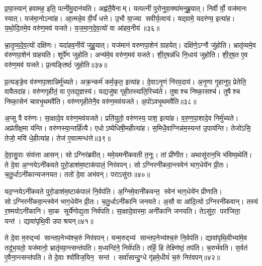 प्र॒घा॒स्यान्॑ हवामह॒ इति॒ पत्नी॑मु॒दान॑यति।
अह्व॑तै॒वैनाम्।
यत्पत्नी॑ पुरोनुवा॒क्या॑मनुब्रू॒यात्।
निर्वीर्यो॒ यज॑मानः स्यात्।
यज॑मा॒नोऽन्वा॑ह।
आ॒त्मन्ने॒व वी॒र्यं॑ धत्ते।
उ॒भौ या॒ज्या सवीर्य॒त्वाय॑।
यद्ग्रामे॒ यदर॑ण्य॒ इत्या॑ह।
य॒थो॒दि॒तमे॒व वरु॑ण॒मव॑ यजते।
य॒ज॒मा॒न॒दे॒व॒त्यो॑ वा आ॑हव॒नीय॑॥३६॥

भ्रा॒तृ॒व्य॒दे॒व॒त्यो॑ दक्षि॑णः।
यदा॑हव॒नीये॑ जुहु॒यात्।
यज॑मानं वरुणपा॒शेन॑ ग्राहयेत्।
दक्षि॑णे॒ऽग्नौ जु॑होति।
भ्रातृ॑व्यमे॒व व॑रुणपा॒शेन॑ ग्राहयति।
शूर्पे॑ण जुहोति।
अन्य॑मे॒व वरु॑ण॒मव॑ यजते।
शी॒र्॒षन्न॑धि नि॒धाय॑ जुहोति।
शी॒र्॒\mbox{}ष॒त ए॒व वरु॑ण॒मव॑ यजते।
प्र॒त्यङ्तिष्ठं॑ जुहोति॥३७॥

प्र॒त्यङ्ङे॒व व॑रुणपा॒शान्निर्मु॑च्यते।
अक्र॒न्कर्म॑ कर्म॒कृत॒ इत्या॑ह।
दे॒वाऽनृ॒णं नि॑रव॒दाय॑।
अ॒नृ॒णा गृ॒हानुप॒ प्रेतेति॒ वावैतदा॑ह।
वरु॑णगृहीतं॒ वा ए॒तद्य॒ज्ञस्य॑।
यद्यजु॑षा गृही॒तस्या॑ति॒रिच्य॑ते।
तुषाश्च निष्का॒सश्च॑।
तुषैश्च निष्का॒सेन॑ चावभृ॒थमवै॑ति।
वरु॑णगृहीतेनै॒व वरु॑ण॒मव॑यजते।
अ॒पो॑ऽवभृ॒थमवै॑ति॥३८॥

अ॒प्सु वै वरु॑णः।
सा॒क्षादे॒व वरु॑ण॒मव॑यजते।
प्रति॑युतो॒ वरु॑णस्य॒ पाश॒ इत्या॑ह।
व॒रु॒ण॒पा॒शादे॒व निर्मु॑च्यते।
अप्र॑तीक्ष॒मा य॑न्ति।
वरु॑णस्या॒न्तर्\mbox{}हि॑त्यै।
एधोऽष्येधिषी॒मही\-त्या॑ह।
स॒मिधै॒वाग्निन्न॑म॒स्यन्त॑ उ॒पाय॑न्ति।
तेजो॑ऽसि॒ तेजो॒ मयि॑ धे॒हीत्या॑ह।
तेज॑ ए॒वात्मन्ध॑त्ते॥३९॥

दे॒वा॒सु॒राः संय॑त्ता आसन्।
सोऽग्निर॑ब्रवीत्।
ममे॒यमनी॑कवती त॒नूः।
तां प्री॑णीत।
अथासु॑रान॒भि भ॑विष्य॒थेति॑।
ते दे॒वा अ॒ग्नयेऽनी॑कवते पुरो॒डाश॑म॒ष्टाक॑पालं॒ निर॑वपन्।
सोऽग्निरनी॑कवा॒न्त्स्वेन॑ भाग॒धेये॑न प्री॒तः।
च॒तु॒र्धाऽनी॑कान्य\-जनयत।
ततो॑ दे॒वा अभ॑वन्।
पराऽसु॑राः॥४०॥

यद॒ग्नयेऽनी॑कवते पुरो॒डाश॑म॒ष्टाक॑पालं नि॒र्वप॑ति।
अ॒ग्निमे॒वानी॑कवन्त॒ स्वेन॑ भाग॒धेये॑न प्रीणाति।
सोऽग्निरनी॑कवा॒न्त्स्वेन॑ भाग॒धेये॑न प्री॒तः।
च॒तु॒र्धाऽनी॑कानि जनयते।
अ॒सौ वा आ॑दि॒त्योऽग्निरनी॑कवान्।
तस्य॑ र॒श्मयोऽनी॑कानि।
सा॒क सूर्ये॑णोद्य॒ता निर्व॑पति।
सा॒क्षादे॒वास्मा॒ अनी॑कानि जनयति।
तेऽसु॑रा॒ परा॑जिता॒ यन्त॑।
द्यावा॑पृथि॒वी उपाश्रयन्॥४१॥

ते दे॒वा म॒रुद्भ्य॑ सान्तप॒नेभ्य॑श्च॒रुं निर॑वपन्।
यन्म॒रुद्भ्य॑ सान्तप॒नेभ्य॑श्च॒रुं नि॒र्वप॑ति।
द्यावा॑पृथि॒वीभ्या॑मे॒व तदु॑भ॒यतो॒ यज॑मानो॒ भ्रातृ॑व्या॒न्त्सन्त॑पति।
म॒ध्यन्दि॑ने॒ निर्व॑पति।
तर्\mbox{}हि॒ हि तेक्ष्णि॑ष्ठं॒ तप॑ति।
च॒रुर्भ॑वति।
स॒र्वत॑ ए॒वैना॒न्त्सन्त॑पति।
ते दे॒वाः श्वो॑विज॒यिन॒ सन्त॑।
सर्वा॑सान्दु॒ग्धे गृ॑हमे॒धीयं॑ च॒रुं निर॑वपन्॥४२॥

